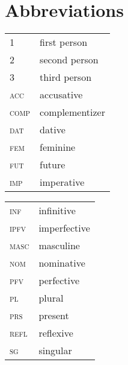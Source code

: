\documentclass[output=paper]{LSP/langsci}
\begin{document}
\section*{Abbreviations}
\begin{tabularx}{.45\textwidth}{lQ}
1 & first person\\
2 & second person\\
3 & third person\\
\textsc{acc} & accusative\\
\textsc{comp} & complementizer\\
\textsc{dat} & dative\\
\textsc{fem} & feminine\\
\textsc{fut} & future\\
\textsc{imp} & imperative\\
\end{tabularx}
\begin{tabularx}{.45\textwidth}{lQ}
\textsc{inf} & infinitive\\
\textsc{ipfv} & imperfective\\
\textsc{masc} & masculine\\
\textsc{nom} & nominative\\
\textsc{pfv} & perfective\\
\textsc{pl} & plural\\
\textsc{prs} & present\\
\textsc{refl} & reflexive\\
\textsc{sg} & singular\\
\end{tabularx}


{\sloppy
\printbibliography[heading=subbibliography,notkeyword=this] }
\end{document}
